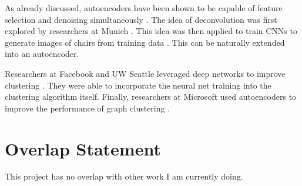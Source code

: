 \documentclass[10pt,twocolumn]{article}
\begin{document}
As already discussed, autoencoders have been shown to be capable of feature selection and denoising simultaneously \cite{noiseae}. The idea of deconvolution was first explored by researchers at Munich \cite{decon2}. This idea was then applied to train CNNs to generate images of chairs from training data \cite{chairs}. This can be naturally extended into an autoencoder. 

Researchers at Facebook and UW Seattle leveraged deep networks to improve clustering \cite{deepcluster}. They were able to incorporate the neural net training into the clustering algorithm itself. Finally, researchers at Microsoft used autoencoders to improve the performance of graph clustering \cite{graph}.

\vspace{-5mm} \section*{Overlap Statement} \vspace{-5mm}
This project has no overlap with other work I am currently doing.


\end{document}
